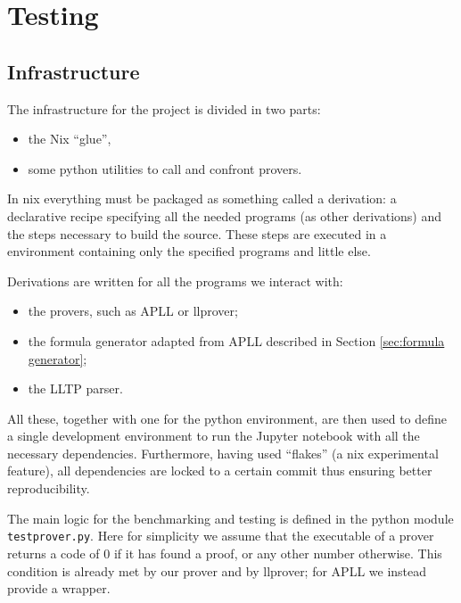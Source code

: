 \chapter{Testing}\label{chapter:testing}
\section{Infrastructure}
The infrastructure for the project is divided in two parts:
\begin{itemize}
	\item the Nix \cite{nix} ``glue'',		
	\item some python utilities to call and confront provers.
\end{itemize}
In nix everything must be packaged as something called a derivation: a declarative recipe specifying all the needed programs (as other derivations) and the steps necessary to build the source.
These steps are executed in a environment containing only the specified programs and little else.

Derivations are written for all the programs we interact with:
\begin{itemize}
	\item the provers, such as APLL or llprover;
	\item the formula generator adapted from APLL described in Section \ref{sec:formula generator};
	\item the LLTP parser.
\end{itemize}
All these, together with one for the python environment, are then used to define a single development environment to run the Jupyter notebook with all the necessary dependencies.
Furthermore, having used ``flakes'' (a nix experimental feature), all dependencies are locked to a certain commit thus ensuring better reproducibility.

The main logic for the benchmarking and testing is defined in the python module \texttt{testprover.py}.
Here for simplicity we assume that the executable of a prover returns a code of 0 if it has found a proof, or any other number otherwise.
This condition is already met by our prover and by llprover; for APLL we instead provide a wrapper.

